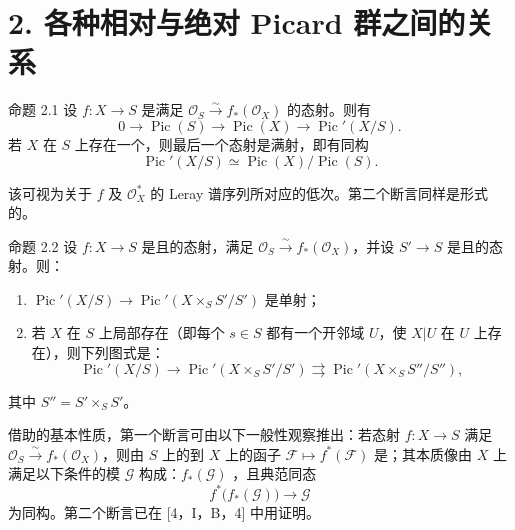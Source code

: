 \section*{2. 各种相对与绝对 Picard 群之间的关系}
\begin{statement}{命题 2.1}
设 $f:X\to S$ 是满足 $\mathcal O_S\xrightarrow{\sim}f_*(\mathcal O_X)$ 的态射。则有
\[0\longrightarrow\operatorname{Pic}(S)\longrightarrow\operatorname{Pic}(X)\longrightarrow\operatorname{Pic}'(X/S).\]
若 $X$ 在 $S$ 上存在一个，则最后一个态射是满射，即有同构
\[\operatorname{Pic}'(X/S)\simeq\operatorname{Pic}(X)/\operatorname{Pic}(S).\]
\end{statement}
该可视为关于 $f$ 及 $\mathcal O_X^*$ 的 Leray 谱序列所对应的低次。第二个断言同样是形式的。

\begin{statement}{命题 2.2}
设 $f:X\to S$ 是且的态射，满足 $\mathcal O_S\xrightarrow{\sim}f_*(\mathcal O_X)$，并设 $S'\to S$ 是且的态射。则：
\begin{enumerate}
\item[(i)] $\operatorname{Pic}'(X/S)\to\operatorname{Pic}'(X\times_S S'/S')$ 是单射；
\item[(ii)] 若 $X$ 在 $S$ 上局部存在（即每个 $s\in S$ 都有一个开邻域 $U$，使 $X|U$ 在 $U$ 上存在），则下列图式是：
\[\operatorname{Pic}'(X/S)\longrightarrow\operatorname{Pic}'(X\times_S S'/S')\rightrightarrows\operatorname{Pic}'(X\times_S S''/S''),\]
\end{enumerate}
其中 $S''=S'\times_S S'$。
\end{statement}
借助的基本性质，第一个断言可由以下一般性观察推出：若态射 $f:X\to S$ 满足 $\mathcal O_S\xrightarrow{\sim}f_*(\mathcal O_X)$，则由 $S$ 上的到 $X$ 上的函子 $\mathcal F\mapsto f^*(\mathcal F)$ 是；其本质像由 $X$ 上满足以下条件的模 $\mathcal G$ 构成：$f_*(\mathcal G)$ ，且典范同态
\[f^*\bigl(f_*(\mathcal G)\bigr)\longrightarrow\mathcal G\]
为同构。第二个断言已在 [4，I，B，4] 中用证明。

